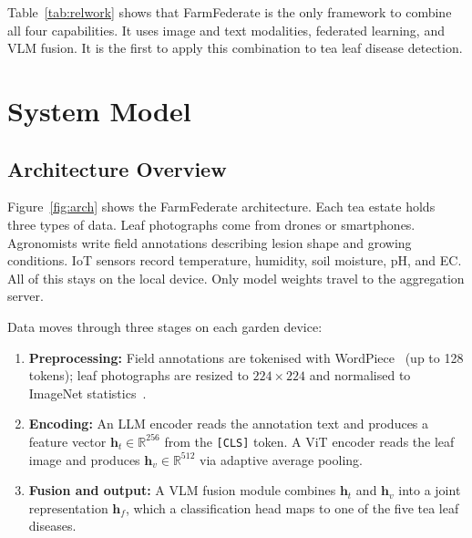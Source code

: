 \documentclass[12pt, a4paper, oneside]{Thesis}
\begin{document}
Table~\ref{tab:relwork} shows that FarmFederate is the only framework to combine all
four capabilities. It uses image and text modalities, federated learning, and VLM
fusion. It is the first to apply this combination to tea leaf disease detection.

\chapter{System Model}
\label{sec:sysmodel}

\section{Architecture Overview}

Figure~\ref{fig:arch} shows the FarmFederate architecture. Each tea estate holds
three types of data. Leaf photographs come from drones or smartphones. Agronomists
write field annotations describing lesion shape and growing conditions. IoT sensors
record temperature, humidity, soil moisture, pH, and EC. All of this stays on the
local device. Only model weights travel to the aggregation server.

Data moves through three stages on each garden device:
\begin{enumerate}
  \item \textbf{Preprocessing:} Field annotations are tokenised with WordPiece~\cite{Devlin2019}
        (up to 128 tokens); leaf photographs are resized to $224{\times}224$ and
        normalised to ImageNet statistics~\cite{Deng2009}.
  \item \textbf{Encoding:} An LLM encoder reads the annotation text and produces a
        feature vector $\mathbf{h}_t \in \mathbb{R}^{256}$ from the \texttt{[CLS]}
        token. A ViT encoder reads the leaf image and produces $\mathbf{h}_v \in
        \mathbb{R}^{512}$ via adaptive average pooling.
  \item \textbf{Fusion and output:} A VLM fusion module combines $\mathbf{h}_t$ and
        $\mathbf{h}_v$ into a joint representation $\mathbf{h}_f$, which a
        classification head maps to one of the five tea leaf diseases.
\end{enumerate}
\end{document}
